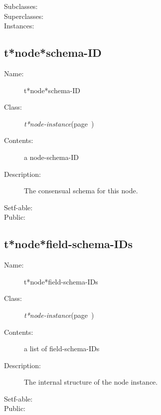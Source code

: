 \begin{description}
\item [Subclasses:]


\item [Superclasses:]


\item [Instances:]



\end{description}
\horizontalline

\subsection{t*node*schema-ID}
\label{t*node*schema-ID}

\begin{description}
\item [Name:]  t*node*schema-ID

\item [Class:] {\sl t*node-instance}\hfill(page~\pageref{t*node-instance})

\item [Contents:] a node-schema-ID

\item [Description:]

The consensual schema for this node.

\item [Setf-able:]


\item [Public:]



\end{description}
\horizontalline

\subsection{t*node*field-schema-IDs}
\label{t*node*field-schema-IDs}

\begin{description}
\item [Name:]  t*node*field-schema-IDs

\item [Class:] {\sl t*node-instance}\hfill(page~\pageref{t*node-instance})

\item [Contents:] a list of field-schema-IDs

\item [Description:]

The internal structure of the node instance. 

\item [Setf-able:]


\item [Public:]



\end{description}
\horizontalline

